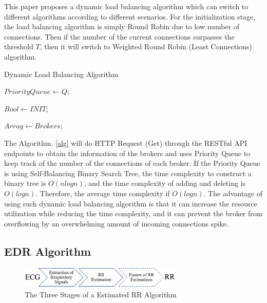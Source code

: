 \documentclass[conference]{IEEEtran}
\begin{document}
This paper proposes a dynamic load balancing algorithm which can switch to different algorithms according to different scenarios. For the initialization stage, the load balancing algorithm is simply Round Robin due to low number of connections. Then if the number of the current connections surpasses the threshold $T$, then it will switch to Weighted Round Robin (Least Connections) algorithm.


\begin{algorithm}
\label{alg}
\caption{Dynamic Load Balancing Algorithm}
\LinesNumbered 
{}

$PriorityQueue \leftarrow Q$;

$Bool \leftarrow INIT$;

$Array \leftarrow Brokers$;


\end{algorithm}

The Algorithm. \ref{alg} will do HTTP Request (Get) through the RESTful API endpoints to obtain the information of the brokers and uses Priority Queue to keep track of the number of the connections of each broker. If the Priority Queue is using Self-Balancing Binary Search Tree, the time complexity to construct a binary tree is $O(nlogn)$, and the time complexity of adding and deleting is $O(logn)$. Therefore, the average time complexity if $O(logn)$. The advantage of using such dynamic load balancing algorithm is that it can increase the resource utilization while reducing the time complexity, and it can prevent the broker from overflowing by an overwhelming amount of incoming connections spike.

\subsection{EDR Algorithm}

\begin{figure}[htbp]
\centering
\includegraphics[width=220pt]{edr.png}
\caption{The Three Stages of a Estimated RR Algorithm}
\label{edr}
\end{figure}
\end{document}
